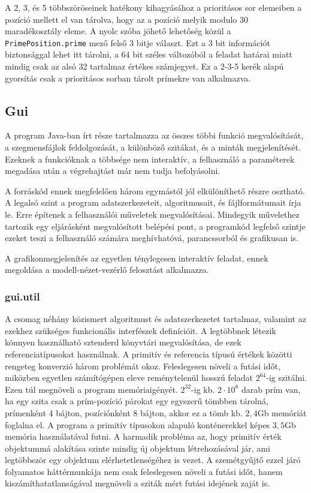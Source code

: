 A 2, 3, és 5 többszöröseinek hatékony kihagyásához a prioritásos sor elemeiben a pozíció mellett el van tárolva, hogy az a pozíció melyik modulo $30$ maradékosztály eleme.
A nyolc szóba jöhető lehetőség közül a \texttt{PrimePosition.prime} mező felső 3 bitje választ.
Ezt a 3 bit információt biztonsággal lehet itt tárolni, a 64 bit széles változóból a feladat határai miatt mindig csak az alsó 32 tartalmaz értékes számjegyet.
Ez a 2-3-5 kerék alapú gyorsítás csak a prioritásos sorban tárolt prímekre van alkalmazva.

\subsection{Gui}

A program Java-ban írt része tartalmazza az összes többi funkció megvalósítását, a szegmensfájlok feldolgozását, a különböző szitákat, és a minták megjelenítését.
Ezeknek a funkcióknak a többsége nem interaktív, a felhasználó a paraméterek megadása után a végrehajtást már nem tudja befolyásolni.

A forráskód ennek megfelelően három egymástól jól elkülöníthető részre osztható.
A legalsó szint a program adatszerkezeteit, algoritmusait, és fájlformátumait írja le. 
Erre építenek a felhasználói műveletek megvalósításai.
Mindegyik művelethez tartozik egy eljárásként megvalósított belépési pont, a programkód legfelső szintje ezeket teszi a felhasználó számára meghívhatóvá, parancssorból és grafikusan is.

A grafikonmegjelenítés az egyetlen ténylegesen interaktív feladat, ennek megoldása a modell-nézet-vezérlő felosztást alkalmazza.

\subsubsection{gui.util}

A csomag néhány közismert algoritmust és adatszerkezetet tartalmaz, valamint az ezekhez szükséges funkcionális interfészek definícióit.
A legtöbbnek létezik könnyen használható sztenderd könyvtári megvalósítása, de ezek referenciatípusokat használnak.
A primitív és referencia típusú értékek közötti rengeteg konverzió három problémát okoz.
Feleslegesen növeli a futási időt, miközben egyetlen számítógépen eleve reménytelenül hosszú feladat $2^{64}$-ig szitálni.
Ezen túl megnöveli a program memóriaigényét.
$2^{32}$-ig kb. $2\cdot10^8$ darab prím van, ha egy szita csak a prím-pozíció párokat egy egyszerű tömbben tárolná, prímenként 4 bájton, pozíciónként 8 bájton, akkor ez a tömb kb. $2,4$Gb memóriát foglalna el.
A program a primitív típusokon alapuló konténerekkel képes $3,5$Gb memória használatával futni.
A harmadik probléma az, hogy primitív érték objektummá alakítása szinte mindig új objektum létrehozásával jár, ami legtöbbször egy objektum elérhetetlenségéhez is vezet.
A szemétgyűjtő ezzel járó folyamatos háttérmunkája nem csak feleslegesen növeli a futási időt, hanem kiszámíthatatlanságával megnöveli a sziták mért futási idejének zaját is.

